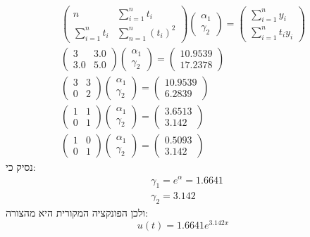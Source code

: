 \documentclass[
]{article}
\begin{document}
\[\begin{gathered}
\begin{pmatrix}
n & \sum_{i=1}^{n}t_{i} \\
\sum_{i=1}^{n}t_{i} & \sum_{n=1}^{n}(t_{i})^{2}  
\end{pmatrix}\begin{pmatrix}
{\alpha}_{1} \\
{\gamma}_{2}
\end{pmatrix}=\begin{pmatrix}
\sum_{i=1}^{n}y_{i}\\
\sum_{i=1}^{n}t_{i}y_{i}  
\end{pmatrix} \\[2ex]
\begin{pmatrix}
3 & 3.0 \\
3.0 & 5.0
\end{pmatrix}\begin{pmatrix}
{\alpha}_{1} \\
{\gamma}_{2}
\end{pmatrix}=\begin{pmatrix}
10.9539 \\
17.2378
\end{pmatrix} \\[2ex]
\begin{pmatrix}
3 & 3 \\
0 & 2
\end{pmatrix}\begin{pmatrix}
{\alpha}_{1} \\
{\gamma}_{2}
\end{pmatrix}=\begin{pmatrix}
10.9539 \\
6.2839
\end{pmatrix} \\[2ex]
\begin{pmatrix}
1 & 1 \\
0 & 1
\end{pmatrix}\begin{pmatrix}
{\alpha}_{1} \\
{\gamma}_{2}
\end{pmatrix}=\begin{pmatrix}
3.6513 \\
3.142
\end{pmatrix} \\[2ex]
\begin{pmatrix}
1 & 0 \\
0 & 1
\end{pmatrix}\begin{pmatrix}
{\alpha}_{1} \\
{\gamma}_{2}
\end{pmatrix}=\begin{pmatrix}
0.5093 \\
3.142
\end{pmatrix}
\end{gathered}\] נסיק כי: \[\begin{aligned}
 & {\gamma}_{1}=e^{\alpha}=1.6641 \\
 & {\gamma}_{2}=3.142
\end{aligned}\] ולכן הפונקציה המקורית היא מהצורה:
\[u(t)=1.6641e^{3.142x}\]
\end{document}
